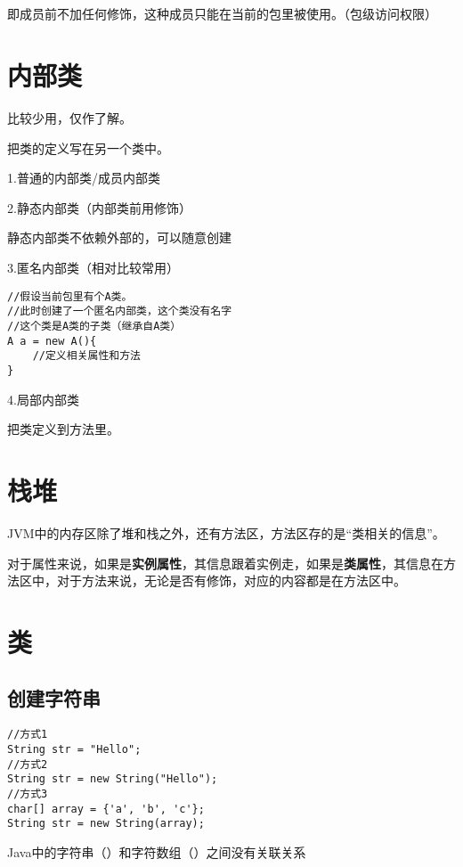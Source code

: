 \documentclass[a4paper]{report}
\begin{document}
\subsection{}
即成员前不加任何修饰，这种成员只能在当前的包里被使用。（包级访问权限）

\section{内部类}
比较少用，仅作了解。

把类的定义写在另一个类中。

1.普通的内部类/成员内部类

2.静态内部类（内部类前用修饰）

静态内部类不依赖外部的，可以随意创建

3.匿名内部类（相对比较常用）

\begin{lstlisting}[title=匿名内部类]
//假设当前包里有个A类。
//此时创建了一个匿名内部类，这个类没有名字
//这个类是A类的子类（继承自A类）
A a = new A(){
    //定义相关属性和方法
}
\end{lstlisting}

4.局部内部类

把类定义到方法里。

\section{栈堆}
JVM中的内存区除了堆和栈之外，还有方法区，方法区存的是“类相关的信息”。

对于属性来说，如果是\textbf{实例属性}，其信息跟着实例走，如果是\textbf{类属性}，其信息在方法区中，对于方法来说，无论是否有修饰，对应的内容都是在方法区中。

\section{类}
\subsection{创建字符串}
\begin{lstlisting}[title=创建字符串]
//方式1
String str = "Hello";
//方式2
String str = new String("Hello");
//方式3
char[] array = {'a', 'b', 'c'};
String str = new String(array);
\end{lstlisting}
Java中的字符串（）和字符数组（）之间没有关联关系
\end{document}
